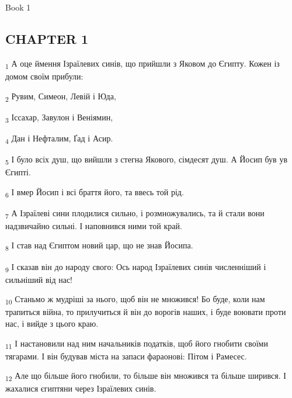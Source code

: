 Book 1
\subsection{CHAPTER 1}
\begin{tcolorbox}
\textsubscript{1} А оце ймення Ізраїлевих синів, що прийшли з Яковом до Єгипту. Кожен із домом своїм прибули:
\end{tcolorbox}
\begin{tcolorbox}
\textsubscript{2} Рувим, Симеон, Левій і Юда,
\end{tcolorbox}
\begin{tcolorbox}
\textsubscript{3} Іссахар, Завулон і Веніямин,
\end{tcolorbox}
\begin{tcolorbox}
\textsubscript{4} Дан і Нефталим, Ґад і Асир.
\end{tcolorbox}
\begin{tcolorbox}
\textsubscript{5} І було всіх душ, що вийшли з стегна Якового, сімдесят душ. А Йосип був ув Єгипті.
\end{tcolorbox}
\begin{tcolorbox}
\textsubscript{6} І вмер Йосип і всі браття його, та ввесь той рід.
\end{tcolorbox}
\begin{tcolorbox}
\textsubscript{7} А Ізраїлеві сини плодилися сильно, і розмножувались, та й стали вони надзвичайно сильні. І наповнився ними той край.
\end{tcolorbox}
\begin{tcolorbox}
\textsubscript{8} І став над Єгиптом новий цар, що не знав Йосипа.
\end{tcolorbox}
\begin{tcolorbox}
\textsubscript{9} І сказав він до народу свого: Ось народ Ізраїлевих синів численніший і сильніший від нас!
\end{tcolorbox}
\begin{tcolorbox}
\textsubscript{10} Станьмо ж мудріші за нього, щоб він не множився! Бо буде, коли нам трапиться війна, то прилучиться й він до ворогів наших, і буде воювати проти нас, і вийде з цього краю.
\end{tcolorbox}
\begin{tcolorbox}
\textsubscript{11} І настановили над ним начальників податків, щоб його гнобити своїми тягарами. І він будував міста на запаси фараонові: Пітом і Рамесес.
\end{tcolorbox}
\begin{tcolorbox}
\textsubscript{12} Але що більше його гнобили, то більше він множився та більше ширився. І жахалися єгиптяни через Ізраїлевих синів.
\end{tcolorbox}
